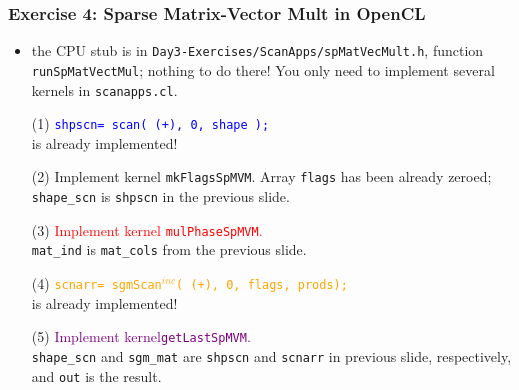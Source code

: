 \documentclass{beamer}
\newcommand{\red}[1]{\textcolor{Red}{{#1}}}
\newcommand{\blue}[1]{\textcolor{Blue}{{#1}}}
\newcommand{\orange}[1]{\textcolor{Orange}{{#1}}}
\newcommand{\purple}[1]{\textcolor{Purple}{{#1}}}
\newcommand{\emphh}[1]{\textcolor{CosGreen}{ #1}}
\newcommand{\mymath}[1]{$ #1 $}
\newcommand{\myindu}[1]{^{#1}}
\begin{document}
\begin{frame}[fragile,t]
  \frametitle{Exercise 4: Sparse Matrix-Vector Mult in OpenCL}

\begin{itemize}
    \item the CPU stub is in {\tt Day3-Exercises/ScanApps/spMatVecMult.h}, function {\tt runSpMatVectMul};
            nothing to do there! You only need to implement several kernels in {\tt scanapps.cl}.\smallskip
    \item[(1)] \blue{\tt shpscn= scan( (+), 0, shape );}\\ is already implemented!
    \item[(2)] \emphh{Implement kernel {\tt mkFlagsSpMVM}.} Array {\tt flags} has been already zeroed;
                {\tt shape\_scn} is {\tt shpscn} in the previous slide.\smallskip
    \item[(3)] \red{Implement kernel {\tt mulPhaseSpMVM}.}\\ 
                {\tt mat\_ind} is {\tt mat\_cols} from the previous slide.\smallskip
    \item[(4)] \orange{\tt scnarr= sgmScan\mymath{\myindu{inc}}( (+), 0, flags, prods);}\\
            is already implemented!\smallskip
    \item[(5)] \purple{Implement kernel{\tt getLastSpMVM}.}\\ {\tt shape\_scn} and
                {\tt sgm\_mat} are {\tt shpscn} and {\tt scnarr} in previous slide,
                respectively, and {\tt out} is the result. 
\end{itemize}

\end{frame}
\end{document}
